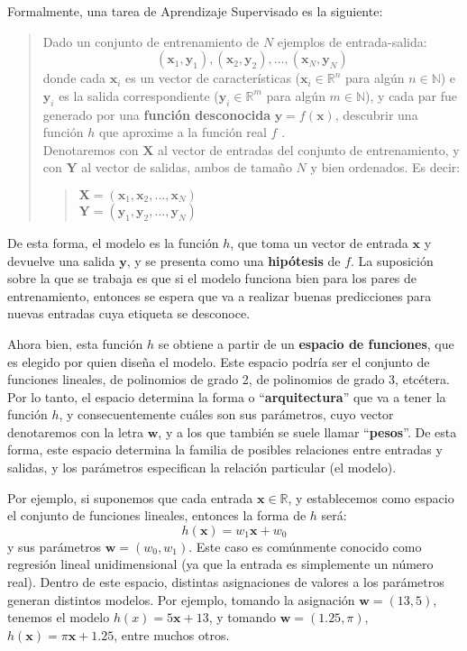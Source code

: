 \documentclass[../../main.tex]{subfiles}
\begin{document}
Formalmente, una tarea de Aprendizaje Supervisado es la siguiente:
\begin{quote}
    Dado un conjunto de entrenamiento de \(N\) ejemplos de entrada-salida:
    \[(\bm{x}_1, \bm{y}_1), (\bm{x}_2, \bm{y}_2), ..., (\bm{x}_N,
    \bm{y}_N)\] donde cada \(\bm{x}_i\) es un vector de características
    (\(\bm{x}_i \in \mathbb{R}^n\) para algún \(n \in \mathbb{N}\)) e \(\bm{y}_i\)
    es la salida correspondiente (\(\bm{y}_i \in \mathbb{R}^m\) para algún \(m \in
    \mathbb{N}\)), y cada par fue generado por una \textbf{función desconocida}
    \(\bm{\bm{y}}=f(\bm{x})\), descubrir una función \(h\) que aproxime a la
    función real \(f\) \cite{ai-a-modern-approach}.\\
    Denotaremos con \(\bm{X}\) al vector de entradas del conjunto de entrenamiento, y
    con \(\bm{Y}\) al vector de salidas, ambos de tamaño \(N\) y bien ordenados. Es
    decir:
    \begin{quote}
        \(\bm{X}=(\bm{x}_1, \bm{x}_2, ..., \bm{x}_N)\)\\
        \(\bm{Y}=(\bm{y}_1, \bm{y}_2, ..., \bm{y}_N)\)
    \end{quote}
\end{quote}
De esta forma, el modelo es la función \(h\), que toma un vector de entrada \(\bm{x}\)
y devuelve una salida \(\bm{y}\), y se presenta como una \textbf{hipótesis} de \(f\).
La suposición sobre la que se trabaja es que si el modelo funciona bien para los pares de
entrenamiento, entonces se espera que va a realizar buenas predicciones para nuevas
entradas cuya etiqueta se desconoce.

Ahora bien, esta función \(h\) se obtiene a partir de un \textbf{espacio de funciones},
que es elegido por quien diseña el modelo. Este espacio podría ser el conjunto de
funciones lineales, de polinomios de grado 2, de polinomios de grado 3, etcétera. Por lo
tanto, el espacio determina la forma o ``\textbf{arquitectura}'' que va a tener la función
\(h\), y consecuentemente cuáles son sus parámetros, cuyo vector denotaremos con la letra
\(\bm{\bm{w}}\), y a los que también se suele llamar ``\textbf{pesos}''. De esta forma,
este espacio determina la familia de posibles relaciones entre entradas y salidas, y los
parámetros especifican la relación particular (el modelo).

Por ejemplo, si suponemos que cada entrada \(\bm{x} \in \mathbb{R}\), y establecemos
como espacio el conjunto de funciones lineales, entonces la forma de \(h\) será:
\[h(\bm{x}) = w_1 \bm{x} + w_0\] y sus parámetros \(\bm{w}=(w_0, w_1)\). Este caso
es comúnmente conocido como regresión lineal unidimensional (ya que la entrada es
simplemente un número real). Dentro de este espacio, distintas asignaciones de valores
a los parámetros generan distintos modelos. Por ejemplo, tomando la asignación
\(\bm{w}=(13, 5)\), tenemos el modelo \(h(x) = 5\bm{x} + 13\), y tomando \(\bm{w}=(1{.}25, \pi)\),
\(h(\bm{x}) = \pi \bm{x} + 1{.}25\), entre muchos otros.
\end{document}
